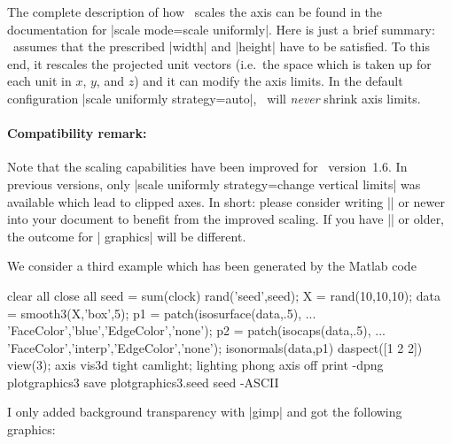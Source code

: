 {{The complete description of how \PGFPlots\ scales the axis can be found in the documentation for |scale mode=scale uniformly|. Here is just a brief summary: \PGFPlots\ assumes that the prescribed |width| and |height| have to be satisfied. To this end, it rescales the projected unit vectors (i.e.\ the space which is taken up for each unit in $x$, $y$, and $z$) and it can modify the axis limits. In the default configuration |scale uniformly strategy=auto|, \PGFPlots\ will \emph{never} shrink axis limits.  

\paragraph{Compatibility remark:} Note that the scaling capabilities have been improved for \PGFPlots\ version~1.6. In previous versions, only |scale uniformly strategy=change vertical limits| was available which lead to clipped axes. In short: please consider writing |\pgfplotsset{compat=1.6}| or newer into your document to benefit from the improved scaling. If you have |\pgfplotsset{compat=1.5}| or older, the outcome for | graphics| will be different.

We consider a third example which has been generated by the Matlab code
\begin{codeexample}
clear all
close all
seed = sum(clock)
rand('seed',seed);
X = rand(10,10,10);
data = smooth3(X,'box',5);
p1 = patch(isosurface(data,.5), ...
   'FaceColor','blue','EdgeColor','none');
p2 = patch(isocaps(data,.5), ...
    'FaceColor','interp','EdgeColor','none');
isonormals(data,p1)
daspect([1 2 2])
view(3); axis vis3d tight
camlight; lighting phong
axis off
print -dpng plotgraphics3
save  plotgraphics3.seed seed -ASCII %
\end{codeexample}
\noindent I only added background transparency with |gimp| and got the following graphics:

{\setlength{\fboxsep}{0pt}%
\centering
{}%

}}}
